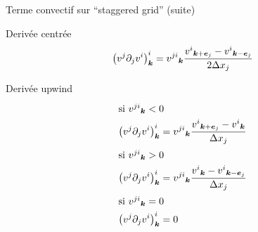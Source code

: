 \begin{frame}{Terme convectif sur ``staggered grid'' (suite)}
\begin{block}{Derivée centrée}
 \begin{equation*}
\left(v^{j}\partial_{j}v^{i}\right)^{i}_{{\boldsymbol {k}}}={v^{ji}}_{{\boldsymbol {k}}}\frac{{v^{i}}_{{\boldsymbol {k}}+{\boldsymbol {e}}_j}-{v^{i}}_{{\boldsymbol {k}}-{\boldsymbol {e}}_j}}{2\Delta x_{j}}
\end{equation*}
\end{block}

\begin{block}{Derivée upwind}
 \begin{align*}
\intertext{si ${v^{ji}}_{{\boldsymbol {k}}}<0$}
\left(v^{j}\partial_{j}v^{i}\right)^{i}_{{\boldsymbol {k}}}&={v^{ji}}_{{\boldsymbol {k}}}\frac{{v^{i}}_{{\boldsymbol {k}}+{\boldsymbol {e}}_j}-{v^{i}}_{{\boldsymbol {k}}}}{\Delta x_{j}}\\
\intertext{si ${v^{ji}}_{{\boldsymbol {k}}}>0$}
\left(v^{j}\partial_{j}v^{i}\right)^{i}_{{\boldsymbol {k}}}&={v^{ji}}_{{\boldsymbol {k}}}\frac{{v^{i}}_{{\boldsymbol {k}}}-{v^{i}}_{{\boldsymbol {k}}-{\boldsymbol {e}}_j}}{\Delta x_{j}}\\
\intertext{si ${v^{ji}}_{{\boldsymbol {k}}}=0$}
\left(v^{j}\partial_{j}v^{i}\right)^{i}_{{\boldsymbol {k}}}&=0
\end{align*}
\end{block}

\end{frame}
